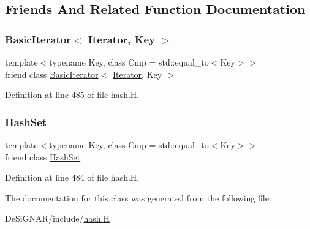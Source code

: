 \subsection{Friends And Related Function Documentation}
\mbox{\label{class_designar_1_1_hash_set_1_1_iterator_a0b375a570add16b09037ce1773f0ddbb}} 
\subsubsection{\texorpdfstring{Basic\+Iterator$<$ Iterator, Key $>$}{BasicIterator< Iterator, Key >}}
{\footnotesize\ttfamily template$<$typename Key, class Cmp = std\+::equal\+\_\+to$<$\+Key$>$$>$ \\
friend class \hyperlink{class_designar_1_1_basic_iterator}{Basic\+Iterator}$<$ \hyperlink{class_designar_1_1_hash_set_1_1_iterator}{Iterator}, Key $>$\hspace{0.3cm}{\ttfamily [friend]}}



Definition at line 485 of file hash.\+H.

\mbox{\label{class_designar_1_1_hash_set_1_1_iterator_ac5220f06200dc3b0d55d050a940f17b9}} 
\subsubsection{\texorpdfstring{Hash\+Set}{HashSet}}
{\footnotesize\ttfamily template$<$typename Key, class Cmp = std\+::equal\+\_\+to$<$\+Key$>$$>$ \\
friend class \hyperlink{class_designar_1_1_hash_set}{Hash\+Set}\hspace{0.3cm}{\ttfamily [friend]}}



Definition at line 484 of file hash.\+H.



The documentation for this class was generated from the following file\+:\begin{DoxyCompactItemize}
\item 
De\+Si\+G\+N\+A\+R/include/\hyperlink{hash_8_h}{hash.\+H}\end{DoxyCompactItemize}

